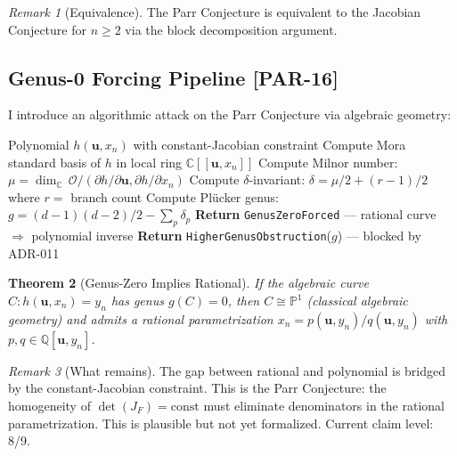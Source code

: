 \documentclass[12pt, letterpaper]{article}
\theoremstyle{plain}
\newtheorem{theorem}{Theorem}[section]
\theoremstyle{definition}
\theoremstyle{remark}
\newtheorem{remark}[theorem]{Remark}
\newcommand{\prior}[1]{\textcolor{SovGold}{\textbf{[PAR-#1]}}}
\begin{document}
\begin{remark}[Equivalence]
The Parr Conjecture is equivalent to the Jacobian Conjecture for $n \geq 2$
via the block decomposition argument.
\end{remark}

\subsection{Genus-0 Forcing Pipeline \prior{16}}

I introduce an algorithmic attack on the Parr Conjecture via algebraic geometry:

\begin{algobox}[title={Algorithm: Genus-0 Forcing (Mora-Plücker Pipeline)}]
\begin{algorithmic}[1]
\Require Polynomial $h(\mathbf{u}, x_n)$ with constant-Jacobian constraint
\State Compute Mora standard basis of $h$ in local ring $\mathbb{C}[[\mathbf{u}, x_n]]$
\State Compute Milnor number: $\mu = \dim_\mathbb{C}\,\mathcal{O}/(\partial h/\partial \mathbf{u}, \partial h/\partial x_n)$
\State Compute $\delta$-invariant: $\delta = \mu/2 + (r-1)/2$ where $r = $ branch count
\State Compute Plücker genus: $g = (d-1)(d-2)/2 - \sum_p \delta_p$
  \State \textbf{Return} \texttt{GenusZeroForced} --- rational curve $\Rightarrow$ polynomial inverse
  \State \textbf{Return} \texttt{HigherGenusObstruction}($g$) --- blocked by ADR-011
\EndIf
\end{algorithmic}
\end{algobox}

\begin{theorem}[Genus-Zero Implies Rational]
If the algebraic curve $C: h(\mathbf{u}, x_n) = y_n$ has genus $g(C) = 0$,
then $C \cong \mathbb{P}^1$ (classical algebraic geometry) and admits a rational
parametrization $x_n = p(\mathbf{u}, y_n)/q(\mathbf{u}, y_n)$ with
$p, q \in \mathbb{Q}[\mathbf{u}, y_n]$.
\end{theorem}

\begin{remark}[What remains]
The gap between rational and polynomial is bridged by the constant-Jacobian constraint.
This is the Parr Conjecture: the homogeneity of $\det(J_F) = \text{const}$ must eliminate
denominators in the rational parametrization. This is plausible but not yet formalized.
Current claim level: 8/9.
\end{remark}

\end{document}
